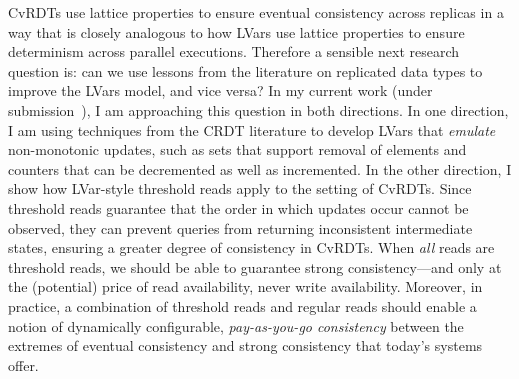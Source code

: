 \documentclass{article}
\begin{document}
CvRDTs use lattice properties to ensure eventual consistency across
replicas in a way that is closely analogous to how LVars use lattice
properties to ensure determinism across parallel executions.
Therefore a sensible next research question is: can we use lessons
from the literature on replicated data types to improve the LVars
model, and vice versa?  In my current work (under
submission~\cite{joining-draft}), I am approaching this question in
both directions.  In one direction, I am using techniques from the
CRDT literature to develop LVars that \emph{emulate} non-monotonic
updates, such as sets that support removal of elements and counters
that can be decremented as well as incremented.  In the other
direction, I show how LVar-style threshold reads apply to the setting
of CvRDTs.  Since threshold reads guarantee that the order in which
updates occur cannot be observed, they can prevent queries from
returning inconsistent intermediate states, ensuring a greater degree
of consistency in CvRDTs.  When \emph{all} reads are threshold reads,
we should be able to guarantee strong consistency---and only at the
(potential) price of read availability, never write
availability. Moreover, in practice, a combination of threshold reads
and regular reads should enable a notion of dynamically configurable,
\emph{pay-as-you-go consistency} between the extremes of eventual
consistency and strong consistency that today's systems offer.


\newcommand{\myname}[0]{\textbf{Lindsey Kuper}}

\end{document}
